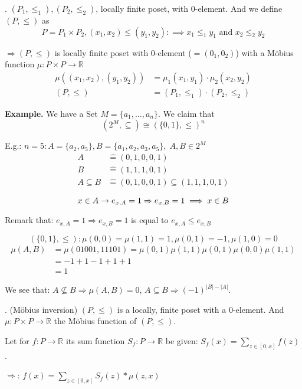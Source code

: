 \Theorem.
$(P_1, \leq_1), (P_2, \leq_2)$, locally finite poset, with 0-element.
And we define $(P, \leq)$ as
\[
  P = P_1 \times P_2, (x_1,x_2) \leq (y_1, y_2) :\implies x_1 \leq_1 y_1 \text{ and } x_2 \leq_2 y_2
\]

$\Rightarrow (P, \leq)$ is locally finite poset with 0-element ($=(0_1, 0_2)$) with a Möbius function $\mu: P\times P \rightarrow \mathbb{R}$
\begin{align*}
  \mu ( (x_1, x_2), (y_1,y_2)) &= \mu_1(x_1,y_1) \cdot \mu_2(x_2,y_2) \\
  (P, \leq) &= (P_1, \leq_1) \cdot (P_2, \leq_2)
\end{align*}

\textbf{Example.}
We have a Set $M = \{a_1, \ldots , a_n\}$. We claim that
\[
  (2^M, \subseteq) \cong ( \{0,1\}, \leq)^n
\]

E.g.: $n = 5: A = \{a_2,a_5\}, B= \{a_1, a_2, a_3, a_5\},\; A, B \in 2^M$
\begin{align*}
  A &\hat{=} (0,1,0,0,1) \\
  B &\hat{=} (1,1,1,0,1) \\
  A \subseteq B &\hat{=} (0,1,0,0,1) \subseteq (1,1,1,0,1) \\
\end{align*}
\[
  x \in A \rightarrow e_{x,A} = 1 \Rightarrow  e_{x,B} = 1 \implies x \in B\\
\]

Remark that: $e_{x,A} = 1 \Rightarrow e_{x,B} = 1$ is equal to $e_{x,A} \leq e_{x,B}$

\[
    ( \{0,1\}, \leq): \mu(0,0) = \mu(1,1) = 1, \mu(0,1) = -1, \mu(1,0) = 0
\]
\begin{align*}
    \mu(A,B) &= \mu(01001, 11101) = \mu(0,1) \mu(1,1) \mu(0,1) \mu(0,0) \mu(1,1) \\
    &= -1 +1 -1 +1 +1 \\
    &= 1
\end{align*}

We see that:
$A\not\subseteq B \Rightarrow \mu(A,B) = 0$,
$A\subseteq B \Rightarrow (-1)^{|B| - |A|}$.

\Theorem.
(Möbius inversion)
$(P, \leq)$ is a locally, finite poset with a 0-element.
And $\mu: P \times P \rightarrow \mathbb{R}$ the Möbius function of $(P, \leq)$.

Let for $f: P \rightarrow \mathbb{R}$ its sum function $S_f: P \rightarrow \mathbb{R}$ be given: $S_f(x) = \sum_{z \in [0,x]} f(z)$.

$\Rightarrow$: $f(x) = \sum_{z \in [0,x]} S_f(z) * \mu(z,x)$

